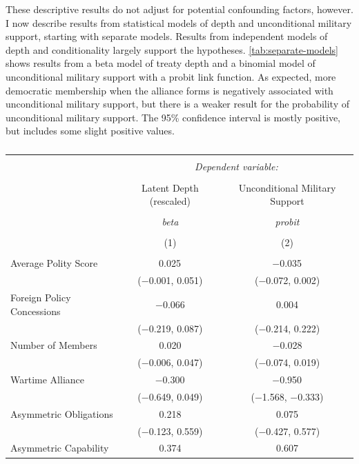 \documentclass[12pt]{article}
\begin{document}
These descriptive results do not adjust for potential confounding factors, however.
I now describe results from statistical models of depth and unconditional military support, starting with separate models. 
Results from independent models of depth and conditionality largely support the hypotheses. 
\autoref{tab:separate-models} shows results from a beta model of treaty depth and a binomial model of unconditional military support with a probit link function. 
As expected, more democratic membership when the alliance forms is negatively associated with unconditional military support, but there is a weaker result for the probability of unconditional military support. 
The 95\% confidence interval is mostly positive, but includes some slight positive values. 


\begin{table}[!htbp] \centering 
  \caption{} 
  \label{tab:separate-models} 
\begin{tabular}{@{\extracolsep{5pt}}lcc} 
\\[-1.8ex]\hline 
\hline \\[-1.8ex] 
 & \multicolumn{2}{c}{\textit{Dependent variable:}} \\ 
\cline{2-3} 
\\[-1.8ex] & Latent Depth (rescaled) & Unconditional Military Support \\ 
\\[-1.8ex] & \textit{beta} & \textit{probit} \\ 
\\[-1.8ex] & (1) & (2)\\ 
\hline \\[-1.8ex] 
 Average Polity Score & 0.025$^{}$ & $-$0.035$^{}$ \\ 
  & ($-$0.001, 0.051) & ($-$0.072, 0.002) \\ 
  Foreign Policy Concessions & $-$0.066 & 0.004 \\ 
  & ($-$0.219, 0.087) & ($-$0.214, 0.222) \\ 
  Number of Members & 0.020 & $-$0.028 \\ 
  & ($-$0.006, 0.047) & ($-$0.074, 0.019) \\ 
  Wartime Alliance & $-$0.300$^{}$ & $-$0.950$^{}$ \\ 
  & ($-$0.649, 0.049) & ($-$1.568, $-$0.333) \\ 
  Asymmetric Obligations & 0.218 & 0.075 \\ 
  & ($-$0.123, 0.559) & ($-$0.427, 0.577) \\ 
  Asymmetric Capability & 0.374 & 0.607 \\ 

\end{tabular}
\end{table}
\end{document}

